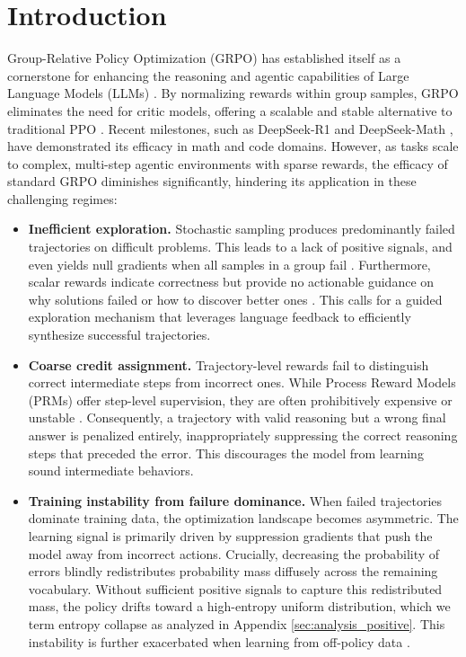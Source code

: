\documentclass[11pt]{article}
\begin{document}
\section{Introduction}
Group-Relative Policy Optimization (GRPO) \cite{shao2024deepseekmath} has established itself as a cornerstone for enhancing the reasoning and agentic capabilities of Large Language Models (LLMs) \cite{cui2025enhancing,shi2025semantic,plaat2025agentic}. By normalizing rewards within group samples, GRPO eliminates the need for critic models, offering a scalable and stable alternative to traditional PPO \cite{schulman2017proximal}. Recent milestones, such as DeepSeek-R1 \cite{guo2025deepseek} and DeepSeek-Math \cite{shao2024deepseekmath}, have demonstrated its efficacy in math and code domains. However, as tasks scale to complex, multi-step agentic environments with sparse rewards, the efficacy of standard GRPO diminishes significantly,  hindering its application in these challenging regimes:
\begin{itemize}
    \item \textbf{Inefficient exploration.} Stochastic sampling produces predominantly failed trajectories on difficult problems. This leads to a lack of positive signals, and even yields null gradients when all samples in a group fail \cite{nan2025ngrpo}. Furthermore, scalar rewards indicate correctness but provide no actionable guidance on why solutions failed or how to discover better ones \cite{zhang2025critique}. This calls for a guided exploration mechanism that leverages language feedback to efficiently synthesize successful trajectories.

    \item \textbf{Coarse credit assignment.} Trajectory-level rewards fail to distinguish correct intermediate steps from incorrect ones. While Process Reward Models (PRMs) \cite{lightman2023let} offer step-level supervision, they are often prohibitively expensive or unstable \cite{xiong2024watch}. Consequently, a trajectory with valid reasoning but a wrong final answer is penalized entirely, inappropriately suppressing the correct reasoning steps that preceded the error. This discourages the model from learning sound intermediate behaviors.

    \item \textbf{Training instability from failure dominance.} When failed trajectories dominate training data, the optimization landscape becomes asymmetric. The learning signal is primarily driven by suppression gradients that push the model away from incorrect actions. Crucially, decreasing the probability of errors blindly redistributes probability mass diffusely across the remaining vocabulary. Without sufficient positive signals to capture this redistributed mass, the policy drifts toward a high-entropy uniform distribution, which we term entropy collapse as analyzed in Appendix \ref{sec:analysis_positive}. This instability is further exacerbated when learning from off-policy data \cite{wu2025learning}.
\end{itemize}
\end{document}
